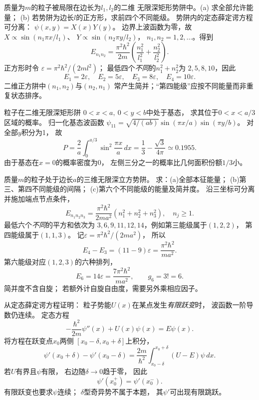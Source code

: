 质量为$m$的粒子被局限在边长为$l_1,l_2$的二维
无限深矩形势阱中。(a) 求全部允许能量；
(b) 若势阱为边长$l$的正方形，求前四个不同能级。
\exsolution
势阱内的定态薛定谔方程可分离：
$\psi(x,y)=X(x)Y(y)$。
边界上波函数为零，故
$X\propto\sin(n_1\pi x/l_1)$、
$Y\propto\sin(n_2\pi y/l_2)$，
$n_1,n_2=1,2,\ldots$。得到
\[
 \boxed{E_{n_1n_2}=\frac{\pi^2\hbar^2}{2m}
 \left(\frac{n_1^2}{l_1^2}+\frac{n_2^2}{l_2^2}\right)}.
\]
正方形时令
$\varepsilon=\pi^2\hbar^2/(2ml^2)$；
最低四个\emph{不同}的$n_1^2+n_2^2$为
$2,5,8,10$，因此
\[
 \boxed{E_1=2\varepsilon,\quad E_2=5\varepsilon,\quad
 E_3=8\varepsilon,\quad E_4=10\varepsilon}.
\]
\excheck 二维正方阱中$(n_1,n_2)$与$(n_2,n_1)$
常产生简并；“第四能级”应按不同能量而非重复状态排序。

粒子在二维无限深矩形阱
$0<x<a,\ 0<y<b$中处于基态，
求其位于$0<x<a/3$区域的概率。
\exsolution
归一化基态波函数
$\psi_{11}=\sqrt{4/(ab)}
\sin(\pi x/a)\sin(\pi y/b)$。
对全部$y$积分为1，
故
\[
 P=\frac2a\int_0^{a/3}\sin^2\frac{\pi x}{a}\,dx
 =\boxed{\frac13-\frac{\sqrt3}{4\pi}
 \simeq0.1955}.
\]
\excheck 由于基态在$x=0$的概率密度为0，
左侧三分之一的概率比几何面积份额$1/3$小。

质量$m$的粒子处于边长$a$的三维无限深立方势阱。
求：(a)全部本征能量；
(b)第三、第四不同能级的间隔；
(c)第六个不同能级的能量及简并度。
\exsolution
沿三坐标可分离并施加端点节点条件，
\[
 \boxed{E_{n_1n_2n_3}=
 \frac{\pi^2\hbar^2}{2ma^2}
 (n_1^2+n_2^2+n_3^2)},\quad n_j\ge1.
\]
最低六个\emph{不同}的平方和依次为
$3,6,9,11,12,14$，例如第三能级属于$(1,2,2)$，
第四能级属于$(1,1,3)$。
记$\varepsilon=\pi^2\hbar^2/(2ma^2)$，
所以
\[
 \boxed{E_4-E_3=(11-9)\varepsilon
 =\frac{\pi^2\hbar^2}{ma^2}}.
\]
第六能级对应$(1,2,3)$的六种排列，
\[
 \boxed{E_6=14\varepsilon=\frac{7\pi^2\hbar^2}{ma^2}},
 \qquad \boxed{g_6=3!=6}.
\]
\excheck 简并度不含自旋；
若额外计自旋自由度，需要另外乘相应因子。

从定态薛定谔方程证明：
粒子势能$U(x)$在某点发生\emph{有限跃变}时，
波函数一阶导数仍连续。
\exsolution
定态方程
\[
 -\frac{\hbar^2}{2m}\psi''(x)+U(x)\psi(x)=E\psi(x).
\]
将方程在跃变点$x_0$两侧
$[x_0-\delta,x_0+\delta]$上积分，
\[
 \psi'(x_0+\delta)-\psi'(x_0-\delta)
 =\frac{2m}{\hbar^2}
 \int_{x_0-\delta}^{x_0+\delta}(U-E)\psi\,dx.
\]
若$U$有界且$\psi$有限，
右边随$\delta\to0$趋于零，
因此
\[
 \boxed{\psi'(x_0^+)=\psi'(x_0^-)}.
\]
\excheck 有限跃变也要求$\psi$连续；
$\delta$型奇异势不属于本题，
其$\psi'$可出现有限跳跃。

